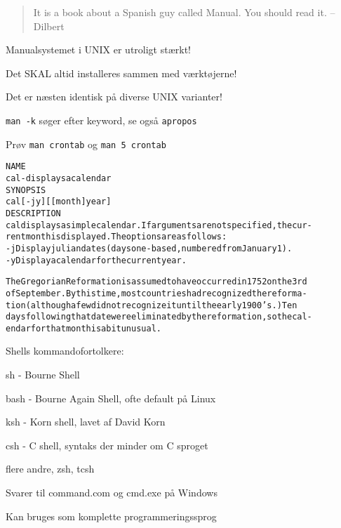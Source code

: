 \documentclass[Screen16to9,17pt]{foils}
\begin{document}



\begin{quote}
 It is a book about a Spanish guy called Manual. You should read it.
       -- Dilbert
\end{quote}

\begin{list1}
\item Manualsystemet i UNIX er utroligt stærkt!
\item Det SKAL altid installeres sammen med værktøjerne!
\item Det er næsten identisk på diverse UNIX varianter!
\item \verb+man -k+ søger efter keyword, se også \verb+apropos+
\end{list1}

Prøv \verb+man crontab+ og \verb+man 5 crontab+




\begin{alltt}\footnotesize
\small
NAME
     cal - displays a calendar
SYNOPSIS
     cal [-jy] [[month]  year]
DESCRIPTION
   cal displays a simple calendar.  If arguments are not specified, the cur-
   rent month is displayed.  The options are as follows:
   -j      Display julian dates (days one-based, numbered from January 1).
   -y      Display a calendar for the current year.

The Gregorian Reformation is assumed to have occurred in 1752 on the 3rd
of September.  By this time, most countries had recognized the reforma-
tion (although a few did not recognize it until the early 1900's.)  Ten
days following that date were eliminated by the reformation, so the cal-
endar for that month is a bit unusual.
\end{alltt}


\begin{list1}
\item Shells kommandofortolkere:
  \begin{list2}
    \item sh - Bourne Shell
\item bash - Bourne Again Shell, ofte default på Linux
\item ksh - Korn shell, lavet af David Korn
\item csh - C shell, syntaks der minder om C sproget
\item flere andre, zsh, tcsh
  \end{list2}
\item Svarer til command.com og cmd.exe på Windows
\item Kan bruges som komplette programmeringssprog
\end{list1}
\end{document}
